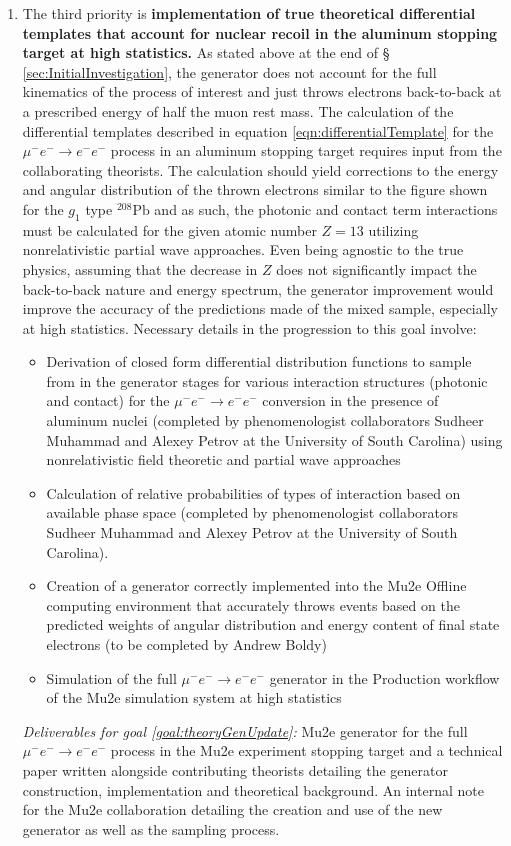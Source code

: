 \documentclass[12pt]{article}
\newcommand{\muEtoEE}{\mu^- e^- \to e^- e^-}
\begin{document}
\begin{enumerate}
\item \label{goal:theoryGenUpdate}The third priority is \textbf{implementation of true theoretical differential templates that account for nuclear recoil in the aluminum stopping target at high statistics.} As stated above at the end of \S~ \ref{sec:InitialInvestigation}, the generator does not account for the full kinematics of the process of interest and just throws electrons back-to-back at a prescribed energy of half the muon rest mass. The calculation of the differential templates described in equation \ref{eqn:differentialTemplate} for the $\muEtoEE$ process in an aluminum stopping target requires input from the collaborating theorists. The calculation should yield corrections to the energy and angular distribution of the thrown electrons similar to the figure shown for the $g_1$ type $^{208}\text{Pb}$ and as such, the photonic and contact term interactions must be calculated for the given atomic number $Z=13$ utilizing nonrelativistic partial wave approaches. Even being agnostic to the true physics, assuming that the decrease in $Z$ does not significantly impact the back-to-back nature and energy spectrum, the generator improvement would improve the accuracy of the predictions made of the mixed sample, especially at high statistics. Necessary details in the progression to this goal involve:
\begin{itemize}
    \item Derivation of closed form differential distribution functions to sample from in the generator stages for various interaction structures (photonic and contact) for the $\muEtoEE$ conversion in the presence of aluminum nuclei (completed by phenomenologist collaborators Sudheer Muhammad and Alexey Petrov at the University of South Carolina) using nonrelativistic field theoretic and partial wave approaches
    \item Calculation of relative probabilities of types of interaction based on available phase space (completed by phenomenologist collaborators Sudheer Muhammad and Alexey Petrov at the University of South Carolina).
    \item Creation of a generator correctly implemented into the Mu2e Offline computing environment  that accurately throws events based on the predicted weights of angular distribution and energy content of final state electrons (to be completed by Andrew Boldy)
    \item Simulation of the full $\muEtoEE$ generator in the Production workflow of the Mu2e simulation system at high statistics 
\end{itemize}
\textit{Deliverables for goal \ref{goal:theoryGenUpdate}:} Mu2e generator for the full $\muEtoEE$ process in the Mu2e experiment stopping target and a technical paper written alongside contributing theorists detailing the generator construction, implementation and theoretical background. An internal note for the Mu2e collaboration detailing the creation and use of the new generator as well as the sampling process.
 

\end{enumerate}
\end{document}
